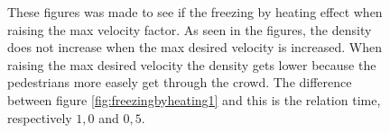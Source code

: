 \begin{figure}[h]
\centering
{}
\caption{These figures was made to see if the freezing by heating effect when raising the max velocity factor. As seen in the figures, the
density does not increase when the max desired velocity is increased. When raising the max desired velocity the density gets lower because
the pedestrians more easely get through the crowd. The difference between figure \ref{fig:freezingbyheating1} and this is the relation time,
respectively $1,0$ and $0,5$.}
\label{fig:freezingbyheating05}
\end{figure}

